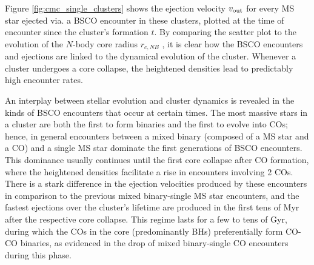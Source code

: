 \documentclass[twocolumn]{aastex631}
\newcommand{\CMC}{\texttt{CMC}}
\begin{document}
Figure \ref{fig:cmc_single_clusters} shows the ejection velocity $v_{\rm out}$ for every MS star ejected via. a BSCO encounter in these clusters, plotted at the time of encounter since the cluster's formation $t$.
By comparing the scatter plot to the evolution of the $N$-body core radius $r_{c, NB}$ \citep{1985ApJ...298...80C}, it is clear how the BSCO encounters and ejections are linked to the dynamical evolution of the cluster.
Whenever a cluster undergoes a core collapse, the heightened densities lead to predictably high encounter rates.

\begin{figure*}
    \caption{
        Scatter plots of the cluster ejection velocity $V_{rm out}$ versus encounter time $t$ for every escaping object from the integrated encounters for the four sample \CMC\ models (see the beginning of \S\ref{subsec:single_clusters} for details).
        The histograms show the same data in 1D.
        The different types of encounters are color-coded: encounters between a binary star and a CO are in red,
        encounters between a mixed binary (1 star and 1 CO) and a CO are in blue, encounters between a mixed binary and a star are in yellow, and encounters between a CO binary and a star are in purple.
        The $N$-body core radius $r_{c, NB}$ \citep{1985ApJ...298...80C} of the model is plotted in maroon over the timewise histogram.
    }
    \label{fig:cmc_single_clusters}
\end{figure*}

An interplay between stellar evolution and cluster dynamics is revealed in the kinds of BSCO encounters that occur at certain times.
The most massive stars in a cluster are both the first to form binaries and the first to evolve into COs; hence, in general encounters between a mixed binary (composed of a MS star and a CO) and a single MS star dominate the first generations of BSCO encounters.
This dominance usually continues until the first core collapse after CO formation, where the heightened densities facilitate a rise in encounters involving 2 COs.
There is a stark difference in the ejection velocities produced by these encounters in comparison to the previous mixed binary-single MS star encounters, and the fastest ejections over the cluster's lifetime are produced in the first tens of Myr after the respective core collapse.
This regime lasts for a few to tens of Gyr, during which the COs in the core (predominantly BHs) preferentially form CO-CO binaries, as evidenced in the drop of mixed binary-single CO encounters during this phase.
\end{document}

